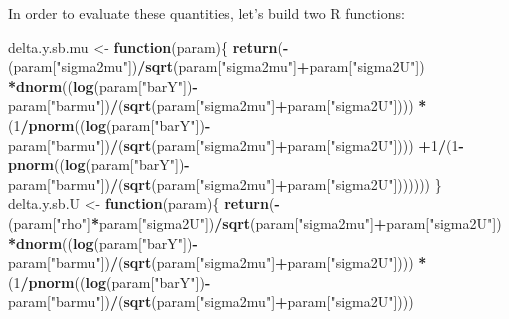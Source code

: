 \documentclass[]{book}
\newenvironment{Shaded}{\begin{snugshade}}{\end{snugshade}}
\newcommand{\ControlFlowTok}[1]{\textcolor[rgb]{0.13,0.29,0.53}{\textbf{#1}}}
\newcommand{\DecValTok}[1]{\textcolor[rgb]{0.00,0.00,0.81}{#1}}
\newcommand{\KeywordTok}[1]{\textcolor[rgb]{0.13,0.29,0.53}{\textbf{#1}}}
\newcommand{\NormalTok}[1]{#1}
\newcommand{\OperatorTok}[1]{\textcolor[rgb]{0.81,0.36,0.00}{\textbf{#1}}}
\newcommand{\StringTok}[1]{\textcolor[rgb]{0.31,0.60,0.02}{#1}}
\theoremstyle{definition}
\theoremstyle{definition}
\theoremstyle{definition}
\theoremstyle{remark}
\begin{document}
In order to evaluate these quantities, let's build two R functions:

\begin{Shaded}
\begin{Highlighting}[]
\NormalTok{delta.y.sb.mu <-}\StringTok{ }\ControlFlowTok{function}\NormalTok{(param)\{}
  \KeywordTok{return}\NormalTok{(}\OperatorTok{-}\NormalTok{(param[}\StringTok{"sigma2mu"}\NormalTok{])}\OperatorTok{/}\KeywordTok{sqrt}\NormalTok{(param[}\StringTok{"sigma2mu"}\NormalTok{]}\OperatorTok{+}\NormalTok{param[}\StringTok{"sigma2U"}\NormalTok{])}
         \OperatorTok{*}\KeywordTok{dnorm}\NormalTok{((}\KeywordTok{log}\NormalTok{(param[}\StringTok{"barY"}\NormalTok{])}\OperatorTok{-}\NormalTok{param[}\StringTok{"barmu"}\NormalTok{])}\OperatorTok{/}\NormalTok{(}\KeywordTok{sqrt}\NormalTok{(param[}\StringTok{"sigma2mu"}\NormalTok{]}\OperatorTok{+}\NormalTok{param[}\StringTok{"sigma2U"}\NormalTok{])))}
         \OperatorTok{*}\NormalTok{(}\DecValTok{1}\OperatorTok{/}\KeywordTok{pnorm}\NormalTok{((}\KeywordTok{log}\NormalTok{(param[}\StringTok{"barY"}\NormalTok{])}\OperatorTok{-}\NormalTok{param[}\StringTok{"barmu"}\NormalTok{])}\OperatorTok{/}\NormalTok{(}\KeywordTok{sqrt}\NormalTok{(param[}\StringTok{"sigma2mu"}\NormalTok{]}\OperatorTok{+}\NormalTok{param[}\StringTok{"sigma2U"}\NormalTok{])))}
           \OperatorTok{+}\DecValTok{1}\OperatorTok{/}\NormalTok{(}\DecValTok{1}\OperatorTok{-}\KeywordTok{pnorm}\NormalTok{((}\KeywordTok{log}\NormalTok{(param[}\StringTok{"barY"}\NormalTok{])}\OperatorTok{-}\NormalTok{param[}\StringTok{"barmu"}\NormalTok{])}\OperatorTok{/}\NormalTok{(}\KeywordTok{sqrt}\NormalTok{(param[}\StringTok{"sigma2mu"}\NormalTok{]}\OperatorTok{+}\NormalTok{param[}\StringTok{"sigma2U"}\NormalTok{]))))))}
\NormalTok{\}}
\NormalTok{delta.y.sb.U <-}\StringTok{ }\ControlFlowTok{function}\NormalTok{(param)\{}
  \KeywordTok{return}\NormalTok{(}\OperatorTok{-}\NormalTok{(param[}\StringTok{"rho"}\NormalTok{]}\OperatorTok{*}\NormalTok{param[}\StringTok{"sigma2U"}\NormalTok{])}\OperatorTok{/}\KeywordTok{sqrt}\NormalTok{(param[}\StringTok{"sigma2mu"}\NormalTok{]}\OperatorTok{+}\NormalTok{param[}\StringTok{"sigma2U"}\NormalTok{])}
         \OperatorTok{*}\KeywordTok{dnorm}\NormalTok{((}\KeywordTok{log}\NormalTok{(param[}\StringTok{"barY"}\NormalTok{])}\OperatorTok{-}\NormalTok{param[}\StringTok{"barmu"}\NormalTok{])}\OperatorTok{/}\NormalTok{(}\KeywordTok{sqrt}\NormalTok{(param[}\StringTok{"sigma2mu"}\NormalTok{]}\OperatorTok{+}\NormalTok{param[}\StringTok{"sigma2U"}\NormalTok{])))}
         \OperatorTok{*}\NormalTok{(}\DecValTok{1}\OperatorTok{/}\KeywordTok{pnorm}\NormalTok{((}\KeywordTok{log}\NormalTok{(param[}\StringTok{"barY"}\NormalTok{])}\OperatorTok{-}\NormalTok{param[}\StringTok{"barmu"}\NormalTok{])}\OperatorTok{/}\NormalTok{(}\KeywordTok{sqrt}\NormalTok{(param[}\StringTok{"sigma2mu"}\NormalTok{]}\OperatorTok{+}\NormalTok{param[}\StringTok{"sigma2U"}\NormalTok{])))}

\end{Highlighting}
\end{Shaded}
\end{document}
